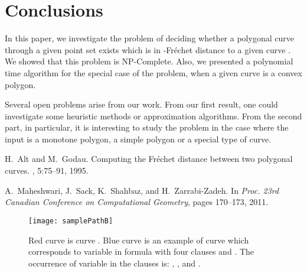 \documentclass[a4paper,UKenglish]{lipics}
\newcommand{\Frechet}{Fr\'echet }
\begin{document}
\section{Conclusions}
\label{sec:conc}
In this paper, we investigate the problem of 
 deciding whether a polygonal curve through a given point set
 exists which is in -\Frechet distance 
to a given curve . We showed that this problem
is NP-Complete. Also, we presented a polynomial 
time algorithm for the special case of the 
problem, when a given curve is a convex polygon. 

Several open problems arise from our work.
From our first result, 
one could investigate some heuristic methods or 
approximation algorithms.
From the second part, in particular, it is interesting 
to study the  problem in the case 
where the input is a monotone polygon, a simple polygon
or a special type of curve.






















\nocite{Simpson}



\begin{thebibliography}{50}
H.~Alt and M.~Godau.
\newblock Computing the {Fr{\'e}chet} distance between two polygonal curves.
, 5:75--91, 1995.


A.~Maheshwari, J.~Sack, K.~Shahbaz, and H.~Zarrabi-Zadeh.
\newblock In {\em Proc. 23rd Canadian Conference on Computational Geometry}, pages 170--173,
  2011.

\end{thebibliography}


\clearpage
\appendix








\begin{figure}[t]
	\centering
	\texttt{[image: samplePathB]}
	\caption{Red curve is curve . Blue curve is an example of curve  which corresponds to variable  in 
	 formula  with four clauses  and . The occurrence of variable   in the clauses is: 
, ,  and .
}
	\label{fig:pathBExample}
\end{figure}
\end{document}
